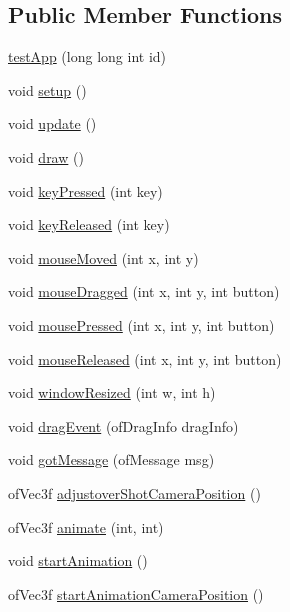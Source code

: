 \subsection*{Public Member Functions}
\begin{DoxyCompactItemize}
\item 
\hyperlink{classtest_app_a3d796120bccff4106a3ec028b9a81912}{test\-App} (long long int id)
\item 
void \hyperlink{classtest_app_ad431db15b6150b965cd52bcba8e16e11}{setup} ()
\item 
void \hyperlink{classtest_app_afb39d201aec71a295b7609876bf7d0c6}{update} ()
\item 
void \hyperlink{classtest_app_af869cba67b1dab8481f8d0e216d59dcd}{draw} ()
\item 
void \hyperlink{classtest_app_a904d147c7e532cb92656d5dd4895cd26}{key\-Pressed} (int key)
\item 
void \hyperlink{classtest_app_a1116a10088e4932f6d482efe723cd45e}{key\-Released} (int key)
\item 
void \hyperlink{classtest_app_a33541b19eff9f8285b2487bfc146d58b}{mouse\-Moved} (int x, int y)
\item 
void \hyperlink{classtest_app_a075bcc2be16fd8f3eaa9162fb40a0a1f}{mouse\-Dragged} (int x, int y, int button)
\item 
void \hyperlink{classtest_app_a3f200702ce91859cac2872a39302679d}{mouse\-Pressed} (int x, int y, int button)
\item 
void \hyperlink{classtest_app_aa3680ffc782b1e5c451289817f20c9c6}{mouse\-Released} (int x, int y, int button)
\item 
void \hyperlink{classtest_app_a428b7df9c64352d6e7cb234fc297e6c9}{window\-Resized} (int w, int h)
\item 
void \hyperlink{classtest_app_af15e9e9064fe5ccbe6c82cc401ae9e09}{drag\-Event} (of\-Drag\-Info drag\-Info)
\item 
void \hyperlink{classtest_app_a66dbc8c5c2d4e20febebe9fd42b8c851}{got\-Message} (of\-Message msg)
\item 
of\-Vec3f \hyperlink{group___camera_animation_ga2a792bfdf269fd69951cbf97d4f574af}{adjustover\-Shot\-Camera\-Position} ()
\item 
of\-Vec3f \hyperlink{group___camera_animation_ga1facfe2200dae7ad147b8f9ab31f68c6}{animate} (int, int)
\item 
void \hyperlink{group___camera_animation_ga79467453f6ea0dd63961a810dca9ac6a}{start\-Animation} ()
\item 
of\-Vec3f \hyperlink{group___camera_animation_ga1a97063e992528dc79867e516d9365f0}{start\-Animation\-Camera\-Position} ()

\end{DoxyCompactItemize}
